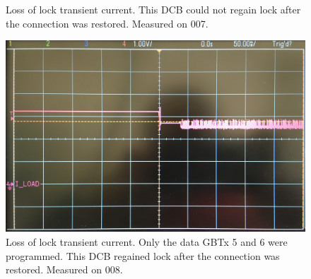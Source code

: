 \documentclass[11pt,letterpaper]{refart}
\begin{document}
\begin{figure}[ht]
\begin{subfigure}{0.38\linewidth}
    \caption{}
    \end{subfigure}
    \hspace{0.02\linewidth}
    \begin{subfigure}{0.38\linewidth}
    \caption{}
    \end{subfigure}
    \caption[Loss of lock transient current, unrecoverable]{
        Loss of lock transient current.
        This DCB could not regain lock after the connection was restored.
        Measured on 007.
    }
\end{figure}

\begin{figure}[ht]
    \centering
    \includegraphics[width=0.8\linewidth]
        {./res/current_transient/loss_of_lock-recoverable.jpg}
    \caption[Loss of lock transient current, recoverable]{
        Loss of lock transient current.
        Only the data GBTx 5 and 6 were programmed.
        This DCB regained lock after the connection was restored.
        Measured on 008.
    }
\end{figure}
\end{document}
